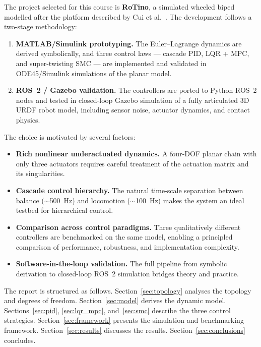 \documentclass[11pt,a4paper]{article}
\begin{document}
The project selected for this course is \textbf{RoTino}, a simulated wheeled biped modelled
after the platform described by Cui et al.~\cite{cui2022}.  The development follows a
two-stage methodology:

\begin{enumerate}[leftmargin=*]
    \item \textbf{MATLAB/Simulink prototyping.}  The Euler--Lagrange dynamics are derived
          symbolically, and three control laws --- cascade PID, LQR + MPC, and super-twisting
          SMC --- are implemented and validated in ODE45/Simulink simulations of the planar
          model.
    \item \textbf{ROS~2 / Gazebo validation.}  The controllers are ported to Python ROS~2
          nodes and tested in closed-loop Gazebo simulation of a fully articulated 3D URDF
          robot model, including sensor noise, actuator dynamics, and contact physics.
\end{enumerate}

The choice is motivated by several factors:
\begin{itemize}[leftmargin=*]
    \item \textbf{Rich nonlinear underactuated dynamics.}  A four-DOF planar chain with only
          three actuators requires careful treatment of the actuation matrix and its
          singularities.
    \item \textbf{Cascade control hierarchy.}  The natural time-scale separation between
          balance ($\sim$500~Hz) and locomotion ($\sim$100~Hz) makes the system an ideal
          testbed for hierarchical control.
    \item \textbf{Comparison across control paradigms.}  Three qualitatively different
          controllers are benchmarked on the same model, enabling a principled comparison of
          performance, robustness, and implementation complexity.
    \item \textbf{Software-in-the-loop validation.}  The full pipeline from symbolic
          derivation to closed-loop ROS~2 simulation bridges theory and practice.
\end{itemize}

The report is structured as follows.  Section~\ref{sec:topology} analyses the topology and
degrees of freedom.  Section~\ref{sec:model} derives the dynamic model.
Sections~\ref{sec:pid}, \ref{sec:lqr_mpc}, and~\ref{sec:smc} describe the three control
strategies.  Section~\ref{sec:framework} presents the simulation and benchmarking framework.
Section~\ref{sec:results} discusses the results.  Section~\ref{sec:conclusions} concludes.
\end{document}
